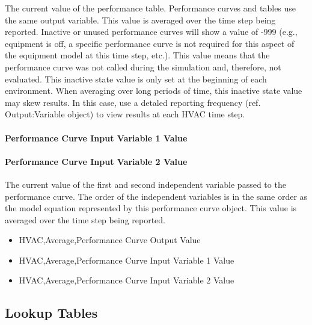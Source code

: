 The current value of the performance table. Performance curves and tables use the same output variable. This value is averaged over the time step being reported. Inactive or unused performance curves will show a value of -999 (e.g., equipment is off, a specific performance curve is not required for this aspect of the equipment model at this time step, etc.). This value means that the performance curve was not called during the simulation and, therefore, not evaluated. This inactive state value is only set at the beginning of each environment. When averaging over long periods of time, this inactive state value may skew results. In this case, use a detaled reporting frequency (ref. Output:Variable object) to view results at each HVAC time step.

\paragraph{\texorpdfstring{Performance Curve Input Variable 1 Value \protect\hyperlink{section-1}{}}{Performance Curve Input Variable 1 Value }}\label{performance-curve-input-variable-1-value-1}

\paragraph{\texorpdfstring{Performance Curve Input Variable 2 Value \protect\hyperlink{section-1}{}}{Performance Curve Input Variable 2 Value }}\label{performance-curve-input-variable-2-value}

The current value of the first and second independent variable passed to the performance curve. The order of the independent variables is in the same order as the model equation represented by this performance curve object. This value is averaged over the time step being reported.

\begin{itemize}
\item
  HVAC,Average,Performance Curve Output Value \protect\hyperlink{section-1}{}
\item
  HVAC,Average,Performance Curve Input Variable 1 Value \protect\hyperlink{section-1}{}
\item
  HVAC,Average,Performance Curve Input Variable 2 Value \protect\hyperlink{section-1}{}
\end{itemize}

\subsection{Lookup Tables}\label{lookup-tables}

